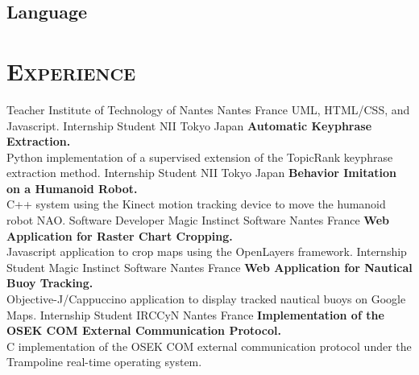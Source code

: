 \documentclass[10pt, a4paper]{moderncv}
\begin{document}
    \subsection{Language}

  \section{\textsc{Experience}}
            {Teacher}                           %
            {Institute of Technology of Nantes} %
            {Nantes}                            %
            {France}                            %
            {UML, HTML/CSS, and Javascript.}    %
            {Internship Student}
            {NII}
            {Tokyo}
            {Japan}
            {\textbf{Automatic Keyphrase Extraction.}\\
             Python implementation of a supervised extension of the TopicRank
             keyphrase extraction method.}
            {Internship Student}
            {NII}
            {Tokyo}
            {Japan}
            {\textbf{Behavior Imitation on a Humanoid Robot.}\\
             C++ system using the Kinect motion tracking device to move the
             humanoid robot NAO.}
            {Software Developer}
            {Magic Instinct Software}
            {Nantes}
            {France}
            {\textbf{Web Application for Raster Chart Cropping.}\\
             Javascript application to crop maps using the OpenLayers
             framework.}
            {Internship Student}
            {Magic Instinct Software}
            {Nantes}
            {France}
            {\textbf{Web Application for Nautical Buoy Tracking.}\\
             Objective-J/Cappuccino application to display tracked nautical
             buoys on Google Maps.}
            {Internship Student}
            {IRCCyN}
            {Nantes}
            {France}
            {\textbf{Implementation of the OSEK COM External Communication
             Protocol.}\\
             C implementation of the OSEK COM external communication protocol
             under the Trampoline real-time operating system.}

  \newpage
  
  
  \nocite{*}
\end{document}
